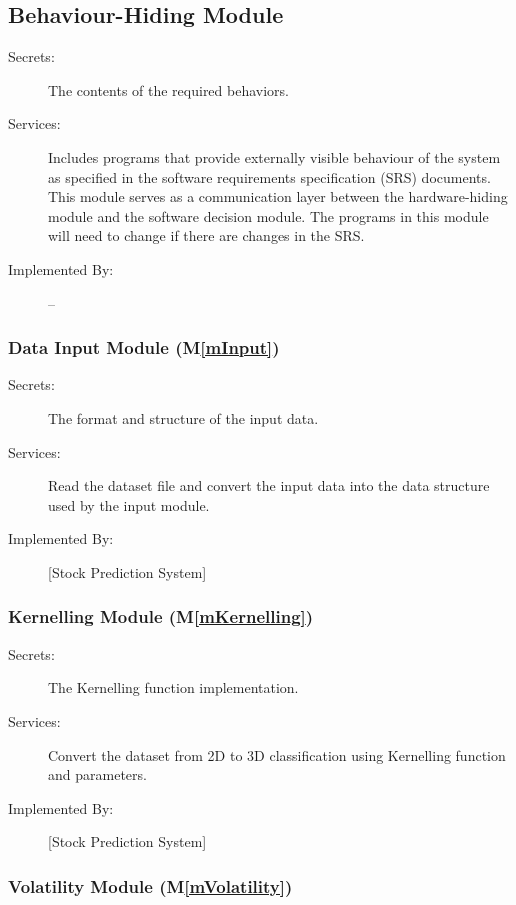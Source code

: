 \documentclass[12pt, titlepage]{article}
\newcommand{\mref}[1]{M\ref{#1}}
\begin{document}
\subsection{Behaviour-Hiding Module}

\begin{description}
\item[Secrets:]The contents of the required behaviors.
\item[Services:]Includes programs that provide externally visible behaviour of
the system as specified in the software requirements specification (SRS)
documents. This module serves as a communication layer between the
hardware-hiding module and the software decision module. The programs in this
module will need to change if there are changes in the SRS.
\item[Implemented By:] --
\end{description}

\subsubsection{Data Input Module (\mref{mInput})}

\begin{description}
\item[Secrets:]The format and structure of the input data.
\item[Services:]Read the dataset file and convert the input data into the data structure used by the
input module.
\item[Implemented By:] [Stock Prediction System]
\end{description}

\subsubsection{Kernelling Module (\mref{mKernelling})}

\begin{description}
\item[Secrets:] The Kernelling function implementation.
\item[Services:] Convert the dataset from 2D to 3D classification using Kernelling function and parameters.
\item[Implemented By:] [Stock Prediction System]
\end{description}

\subsubsection{Volatility Module (\mref{mVolatility})}
\end{document}
